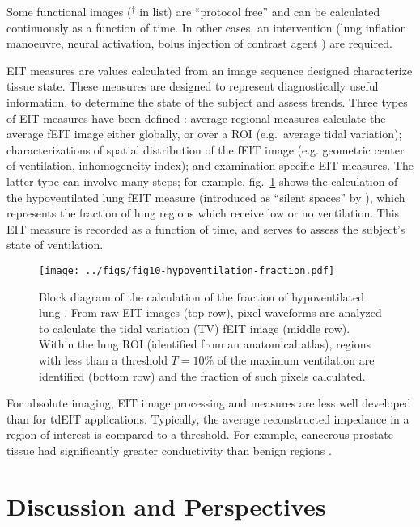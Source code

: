 \documentclass[12pt]{article} \usepackage[margin=3cm]{geometry} \usepackage[margin=20pt,font=small,labelfont=bf]{caption}\def\TBLWIDA{35mm}\def\TBLWIDB{95mm}
\newcommand\fref[1]{fig.\ \ref{#1}}
\begin{document}
Some functional images ($^\dagger$ in list) are ``protocol free'' and can be
calculated continuously as a function of time. In other cases, an intervention
(lung inflation manoeuvre, neural activation, bolus injection of contrast
agent \cite{Frerichs2002Perfusion}) are required.


EIT measures are values calculated from an image sequence designed
characterize tissue state. These measures are designed to represent
diagnostically useful information, to determine the state of the subject
and assess trends.
 Three types of EIT measures
have been defined \cite{Frerichs2017Chest}: 
average regional measures calculate the average fEIT image
either globally, or over a ROI \cite{Ferrario2012morphological}
(e.g.\ average tidal variation);
characterizations of spatial distribution of the fEIT image
(e.g. geometric center of ventilation, inhomogeneity index);
and examination-specific EIT measures.
The latter type can involve many steps; for example, 
\fref{fig:fEIT_eg_silent_spaces} shows the
calculation of the hypoventilated lung fEIT measure 
(introduced as ``silent spaces'' by \cite{Waldmann2015Silent}),
which represents the fraction of lung regions which receive
low or no ventilation. This EIT measure is recorded as a function of time, and
serves to assess the subject's state of ventilation.

\begin{figure} \centering
   \texttt{[image: ../figs/fig10-hypoventilation-fraction.pdf]}
\caption{%
Block diagram of the calculation of the
fraction of hypoventilated lung \cite{Waldmann2015Silent}.
From raw EIT images (top row), pixel waveforms are analyzed
to calculate the tidal variation (TV) fEIT image (middle row).
Within the lung ROI (identified from an anatomical atlas),
regions with less than a threshold $T=10\%$ of the maximum ventilation
are identified (bottom row) and the fraction of such pixels calculated.
}
\label{fig:fEIT_eg_silent_spaces}
\end{figure}

For absolute imaging, EIT image processing and measures are less
well developed than for tdEIT applications. Typically, the
average reconstructed impedance in a region of interest
is compared to a threshold. For example, cancerous prostate
tissue had significantly greater conductivity than benign
regions \cite{Wan2013Transrectal}.


\section{Discussion and Perspectives}
\end{document}
